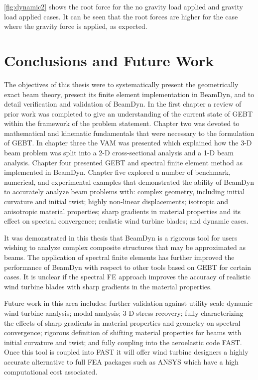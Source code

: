 \documentclass[letterpaper,12pt]{article}
\begin{document}
\ref{fig:dynamic2} shows the root force for the no gravity load applied and gravity load applied cases. It can be seen that the root forces are higher for the case where the gravity force is applied, as expected.


\newpage

\chapter{Conclusions and Future Work}
The objectives of this thesis were to systematically present the geometrically exact beam theory, present its finite element implementation in BeamDyn, and to detail verification and validation of BeamDyn. In the first chapter a review of prior work was completed to give an understanding of the current state of GEBT within the framework of the problem statement. Chapter two was devoted to mathematical and kinematic fundamentals that were necessary to the formulation of GEBT. In chapter three the VAM was presented which explained how the 3-D beam problem was split into a 2-D cross-sectional analysis and a 1-D beam analysis. Chapter four presented GEBT and spectral finite element method as implemented in BeamDyn. Chapter five explored a number of benchmark, numerical, and experimental examples that demonstrated the ability of BeamDyn to accurately analyze beam problems with: complex geometry, including initial curvature and initial twist; highly non-linear displacements; isotropic and anisotropic material properties; sharp gradients in material properties and its effect on spectral convergence; realistic wind turbine blades; and dynamic cases.

It was demonstrated in this thesis that BeamDyn is a rigorous tool for users wishing to analyze complex composite structures that may be approximated as beams. The application of spectral finite elements has further improved the performance of BeamDyn with respect to other tools based on GEBT for certain cases. It is unclear if the spectral FE approach improves the accuracy of realistic wind turbine blades with sharp gradients in the material properties. 

Future work in this area includes: further validation against utility scale dynamic wind turbine analysis; modal analysis; 3-D stress recovery; fully characterizing the effects of sharp gradients in material properties and geometry on spectral convergence; rigorous definition of shifting material properties for beams with initial curvature and twist; and fully coupling into the aeroelastic code FAST. Once this tool is coupled into FAST it will offer wind turbine designers a highly accurate alternative to full FEA packages such as ANSYS which have a high computational cost associated.
\end{document}
